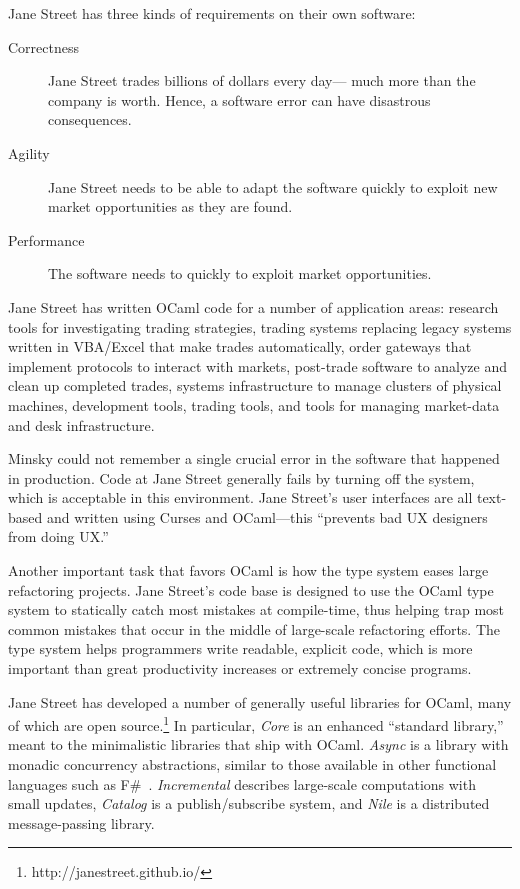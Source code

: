 \documentclass{jfp1}
\begin{document}
Jane Street has three kinds of requirements on their own software:
\begin{description}
\item[Correctness] Jane Street trades billions of dollars every day---
  much more than the company is worth.  Hence, a software error can
  have disastrous consequences.
\item[Agility] Jane Street needs to be able to adapt the software
  quickly to exploit new market opportunities as they are found.
\item[Performance] The software needs to quickly to exploit market
  opportunities.
\end{description}
%
Jane Street has written OCaml code for a number of application areas:
research tools for investigating trading strategies, trading systems
replacing legacy systems written in VBA/Excel that make trades
automatically, order gateways that implement protocols to interact
with markets, post-trade software to analyze and clean up completed
trades, systems infrastructure to manage clusters of physical machines,
development tools, trading tools, and tools for managing market-data
and desk infrastructure.

Minsky could not remember a single crucial error in the software that
happened in production. Code at Jane Street generally fails by turning
off the system, which is acceptable in this environment.  Jane
Street's user interfaces are all text-based and written using
Curses and OCaml---this ``prevents bad UX designers from doing UX.''

Another important task that favors OCaml is how the type system eases large
refactoring projects. Jane Street's code base is designed to use the
OCaml type system to statically catch most mistakes at compile-time,
thus helping trap most common mistakes that occur in the middle of 
large-scale refactoring efforts.  The type system helps programmers
write readable, explicit code, which is more important than great
productivity increases or extremely concise programs.

Jane Street has developed a number of generally useful libraries for
OCaml, many of which are open
source.\footnote{http://janestreet.github.io/} In particular,
\textit{Core} is an enhanced ``standard library,'' meant to the
minimalistic libraries that ship with OCaml.  \textit{Async} is a
library with monadic concurrency abstractions, similar to those
available in other functional languages such as
F\#~\cite{Syme:2011:FAP:1946313.1946334}.  \textit{Incremental}
describes large-scale computations with small updates,
\textit{Catalog} is a publish/subscribe system, and \textit{Nile} is a
distributed message-passing library.
\end{document}
